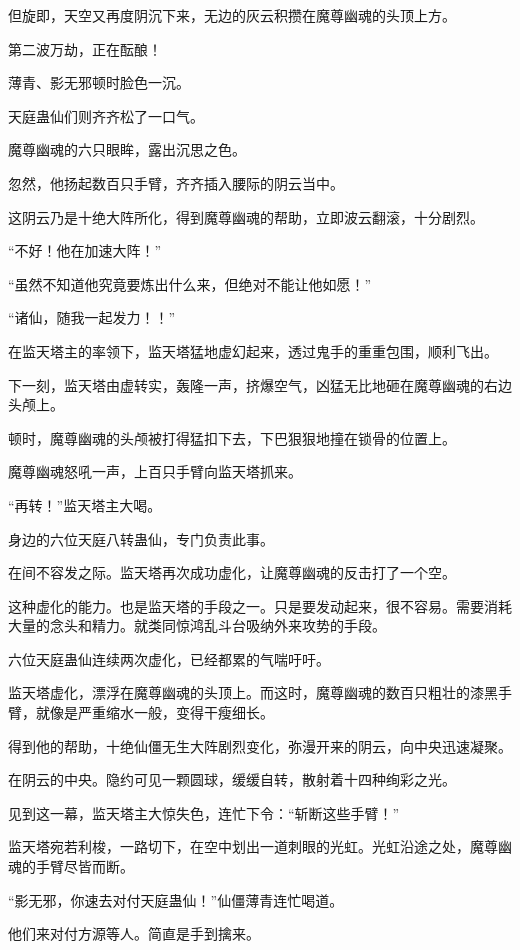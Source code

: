 \begin{this_body}
但旋即，天空又再度阴沉下来，无边的灰云积攒在魔尊幽魂的头顶上方。

第二波万劫，正在酝酿！

薄青、影无邪顿时脸色一沉。

天庭蛊仙们则齐齐松了一口气。

魔尊幽魂的六只眼眸，露出沉思之色。

忽然，他扬起数百只手臂，齐齐插入腰际的阴云当中。

这阴云乃是十绝大阵所化，得到魔尊幽魂的帮助，立即波云翻滚，十分剧烈。

“不好！他在加速大阵！”

“虽然不知道他究竟要炼出什么来，但绝对不能让他如愿！”

“诸仙，随我一起发力！！”

在监天塔主的率领下，监天塔猛地虚幻起来，透过鬼手的重重包围，顺利飞出。

下一刻，监天塔由虚转实，轰隆一声，挤爆空气，凶猛无比地砸在魔尊幽魂的右边头颅上。

顿时，魔尊幽魂的头颅被打得猛扣下去，下巴狠狠地撞在锁骨的位置上。

魔尊幽魂怒吼一声，上百只手臂向监天塔抓来。

“再转！”监天塔主大喝。

身边的六位天庭八转蛊仙，专门负责此事。

在间不容发之际。监天塔再次成功虚化，让魔尊幽魂的反击打了一个空。

这种虚化的能力。也是监天塔的手段之一。只是要发动起来，很不容易。需要消耗大量的念头和精力。就类同惊鸿乱斗台吸纳外来攻势的手段。

六位天庭蛊仙连续两次虚化，已经都累的气喘吁吁。

监天塔虚化，漂浮在魔尊幽魂的头顶上。而这时，魔尊幽魂的数百只粗壮的漆黑手臂，就像是严重缩水一般，变得干瘦细长。

得到他的帮助，十绝仙僵无生大阵剧烈变化，弥漫开来的阴云，向中央迅速凝聚。

在阴云的中央。隐约可见一颗圆球，缓缓自转，散射着十四种绚彩之光。

见到这一幕，监天塔主大惊失色，连忙下令：“斩断这些手臂！”

监天塔宛若利梭，一路切下，在空中划出一道刺眼的光虹。光虹沿途之处，魔尊幽魂的手臂尽皆而断。

“影无邪，你速去对付天庭蛊仙！”仙僵薄青连忙喝道。

他们来对付方源等人。简直是手到擒来。


\end{this_body}
